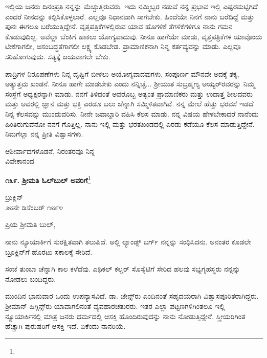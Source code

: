 ಇಲ್ಲಿಯ ಜನರು ದಿನಂಪ್ರತಿ ನನ್ನನ್ನು ಮೆಚ್ಚುತ್ತಿರುವರು. ಇದು ನಮ್ಮಿಬ್ಬರ ನಡುವೆ\enginline{-} ನನ್ನ ಪ್ರಭಾವ ಇಲ್ಲಿ ಎಷ್ಟರಮಟ್ಟಿಗಿದೆ ಎಂದರೆ ನೀನದನ್ನು ಕಲ್ಪಿಸಿಕೊಳ್ಳಲಾರೆ. ಎಲ್ಲವೂ ನಿಧಾನವಾಗಿ ಸಾಗಬೇಕು. ಹಿಂದೆಯೇ ನಿನಗೆ ನಾನು ಬರೆದಿದ್ದೆ ಮತ್ತು ಪುನಃ ಈಗಲೂ ಬರೆಯುತ್ತಿದ್ದೇನೆ. ವೃತ್ತಪತ್ರಿಕೆಗಳಲ್ಲಿರುವ ಯಾವ ಹೊಗಳಿಕೆ ತೆಗಳಿಕೆಗಳಿಗೂ ನಾನು ಗಮನ ಕೊಡುವುದಿಲ್ಲ. ಅವೆಲ್ಲಾ ಬೆಂಕಿಗೆ ಹಾಕಲು ಯೋಗ್ಯವಾದುವು. ನೀನೂ ಹಾಗೆಯೇ ಮಾಡು, ವೃತ್ತಪತ್ರಿಕೆಗಳ ಯಾವೊಂದು ಟೀಕೆಗಾಗಲೀ, ಅಸಂಬದ್ಧತೆಗಾಗಲೀ ಲಕ್ಷ್ಯ ಕೊಡಬೇಡ. ಪ್ರಾಮಾಣಿಕನಾಗಿ ನಿನ್ನ ಕರ್ತವ್ಯವನ್ನು ಮಾಡು. ಎಲ್ಲವೂ ಸರಿಹೋಗುವುದು. ಸತ್ಯಕ್ಕೆ ಜಯವಾಗಲೇ ಬೇಕು.

ಪಾದ್ರಿಗಳ ನಿರೂಪಣೆಗಳು ನಿನ್ನ ದೃಷ್ಟಿಗೆ ಬೀಳಲು ಅಯೋಗ್ಯವಾದವುಗಳು, ಸಂಪೂರ್ಣ ಮೌನವೇ ಅದಕ್ಕೆ ತಕ್ಕ, ಅತ್ಯುತ್ತಮ ಖಂಡನೆ. ನೀನೂ ಹಾಗೇ ಮಾಡಬೇಕು ಎಂದು ನನ್ನಿಚ್ಛೆ... ಶ‍್ರೀಯುತ ಸುಬ್ರಹ್ಮಣ್ಯ ಅಯ್ಯರ್‌ರವರನ್ನು ನಿಮ್ಮ ಸಂಸ್ಥೆಗೆ ಅಧ್ಯಕ್ಷರನ್ನಾಗಿ ಮಾಡು. ನನಗೆ ತಿಳಿದಂತೆ ಅವರೊಬ್ಬ ಅತ್ಯಂತ ಪ್ರಾಮಾಣಿಕರು ಮತ್ತು ಉದಾತ್ತ ಶೀಲದವರು ಮತ್ತು ಅವರಲ್ಲಿ ಜ್ಞಾನ ಮತ್ತು ಭಕ್ತಿ ಎರಡೂ ಬಲು ಚೆನ್ನಾಗಿ ಸಮ್ಮಿಳಿತವಾಗಿವೆ. ನನ್ನ ಮೇಲೆ ಹೆಚ್ಚು ಭರವಸೆ ಇಡದೆ ನಿನ್ನ ಕೆಲಸವನ್ನು ಮುಂದುವರಿಸು. ನೀನೇ ಜವಾಬ್ದಾರಿ ವಹಿಸಿ ಕೆಲಸ ಮಾಡು. ನನ್ನ ವಿಷಯ ಹೇಳಬೇಕಾದರೆ ನಾನೆಂದು ಹಿಂತಿರುಗುವೆನೋ ನನಗೆ ಗೊತ್ತಿಲ್ಲ. ನಾನು ಇಲ್ಲಿ ಮತ್ತು ಭರತಖಂಡದಲ್ಲಿ ಎರಡು ಕಡೆಯೂ ಕೆಲಸ ಮಾಡುತ್ತಿದ್ದೇನೆ. ನಿಮಗೆಲ್ಲಾ ನನ್ನ ಪ್ರೀತಿ ವಿಶ್ವಾಸಗಳು.

\vspace{-0.5cm}

{\flushright
ಆಶೀರ್ವಾದಗಳೊಡನೆ, ನಿರಂತರವೂ ನಿನ್ನ\\ವಿವೇಕಾನಂದ\par}

\begin{center}
\textbf{೧೩೯. ಶ‍್ರೀಮತಿ ಓಲ್‌ಬುಲ್‌ ಅವರಿಗೆ}\footnote{}
\end{center}

\vspace{-0.7cm}

\begin{flushright}
ಬ್ರುಕ್ಲಿನ್\\೨೮ನೇ ಡಿಸೆಂಬರ್ ೧೮೯೪
\end{flushright}

\vspace{-0.5cm}

\noindent
ಪ್ರಿಯ ಶ‍್ರೀಮತಿ ಬುಲ್,

ನಾನು ನ್ಯೂಯಾರ್ಕಿಗೆ ಸುರಕ್ಷಿತವಾಗಿ ತಲುಪಿದೆ. ಅಲ್ಲಿ ಲ್ಯಾಂಡ್ಸ್ ಬರ್ಗ್ ನನ್ನನ್ನು ಸಂಧಿಸಿದನು. ಅನಂತರ ಕೂಡಲೇ ಬ್ರೂಕ್ಲಿನ್‌ಗೆ ಹೊರಟು ಸಕಾಲಕ್ಕೆ ಸೇರಿದೆ.

ಸಂಜೆ ತುಂಬಾ ಚೆನ್ನಾಗಿ ಕಾಲ ಕಳೆದೆವು. ಎಥಿಕಲ್ ಕಲ್ಚರ್ ಸೊಸೈಟಿಗೆ ಸೇರಿದ ಹಲವು ಸಭ್ಯಗೃಹಸ್ಥರು ನನ್ನನ್ನು ನೋಡಲು ಬಂದಿದ್ದರು.

ಮುಂದಿನ ಭಾನುವಾರ ಒಂದು ಉಪನ್ಯಾಸವಿದೆ. ಡಾ. ಜೇನ್ಸ್‌ರು ಎಂದಿನಂತೆ ಸಹೃದಯರಾಗಿ ವಿಶ್ವಾಸಪೂರಿತರಾಗಿದ್ದರು. ಶ‍್ರೀಮಾನ್ ಹಿಗ್ಗಿನ್ಸ್‌ರು ಯಾವಾಗಲಿನಂತೆ ವ್ಯವಹಾರಚತುರರು. ಇತರ ಎಲ್ಲಾ ಪಟ್ಟಣಗಳಿಗಿಂತಲೂ ಇಲ್ಲಿ ನ್ಯೂಯಾರ್ಕಿನಲ್ಲಿ ಮಾತ್ರ ಜನರು ಧರ್ಮದಲ್ಲಿ ಆಸಕ್ತಿ ಹೊಂದಿರುವುದನ್ನು ನಾನು ನೋಡುತ್ತಿದ್ದೇನೆ. ಸ್ತ್ರೀಯರಿಗಿಂತ ಹೆಚ್ಚಾಗಿ ಪುರುಷರಿಗೆ ಆಸಕ್ತಿ ಇದೆ. ಏಕೆಂದು ನಾನರಿಯೆ.

